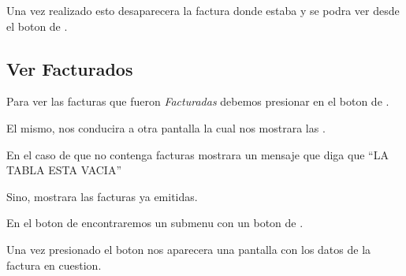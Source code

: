 \documentclass[a4paper,10pt,spanish]{sphinxmanual}
\begin{document}


Una vez realizado esto desaparecera la factura donde estaba y se podra ver desde el boton de .


\subsection{Ver Facturados}
\label{compras:ver-facturados}\label{compras:id1}
Para ver las facturas que fueron \emph{Facturadas} debemos presionar en el boton de .


El mismo, nos conducira a otra pantalla la cual nos mostrara las .

En el caso de que no contenga facturas mostrara un mensaje que diga que ``LA TABLA ESTA VACIA''


Sino, mostrara las facturas ya emitidas.


En el boton de  encontraremos un submenu con un boton de .


Una vez presionado el boton nos aparecera una pantalla con los datos de la factura en cuestion.

\end{document}
